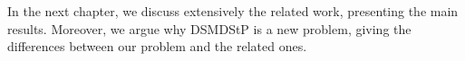 In the next chapter, we discuss extensively the related work, presenting the main results. Moreover, we argue why DSMDStP is 
a new problem, giving the differences between our problem and the related ones.

